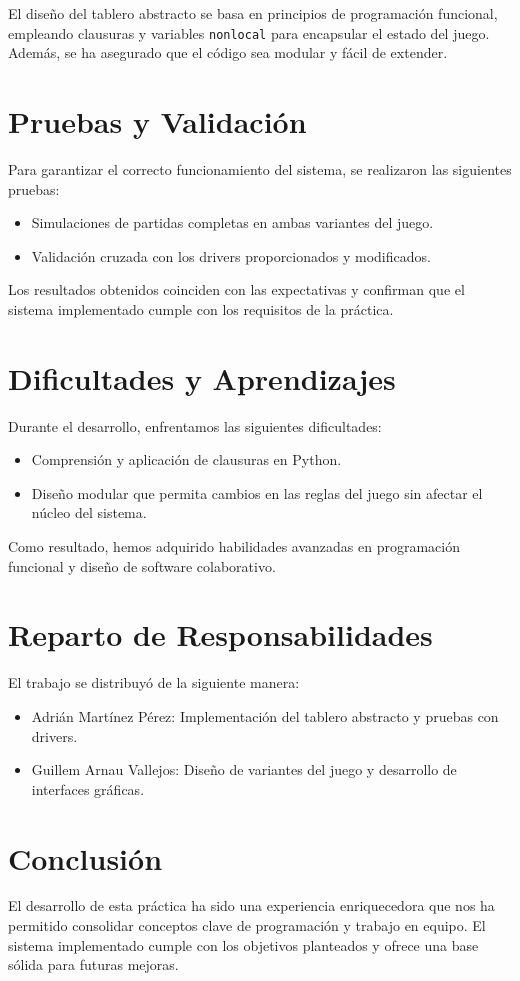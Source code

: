 \documentclass[a4paper,11pt]{article}
\begin{document}
El diseño del tablero abstracto se basa en principios de programación funcional, empleando clausuras y variables \texttt{nonlocal} para encapsular el estado del juego. Además, se ha asegurado que el código sea modular y fácil de extender.

\section{Pruebas y Validación}
Para garantizar el correcto funcionamiento del sistema, se realizaron las siguientes pruebas:
\begin{itemize}
    \item Simulaciones de partidas completas en ambas variantes del juego.
    \item Validación cruzada con los drivers proporcionados y modificados.
\end{itemize}

Los resultados obtenidos coinciden con las expectativas y confirman que el sistema implementado cumple con los requisitos de la práctica.

\section{Dificultades y Aprendizajes}
Durante el desarrollo, enfrentamos las siguientes dificultades:
\begin{itemize}
    \item Comprensión y aplicación de clausuras en Python.
    \item Diseño modular que permita cambios en las reglas del juego sin afectar el núcleo del sistema.
\end{itemize}

Como resultado, hemos adquirido habilidades avanzadas en programación funcional y diseño de software colaborativo.

\section{Reparto de Responsabilidades}
El trabajo se distribuyó de la siguiente manera:
\begin{itemize}
    \item Adrián Martínez Pérez: Implementación del tablero abstracto y pruebas con drivers.
    \item Guillem Arnau Vallejos: Diseño de variantes del juego y desarrollo de interfaces gráficas.
\end{itemize}

\section{Conclusión}
El desarrollo de esta práctica ha sido una experiencia enriquecedora que nos ha permitido consolidar conceptos clave de programación y trabajo en equipo. El sistema implementado cumple con los objetivos planteados y ofrece una base sólida para futuras mejoras.
\end{document}
